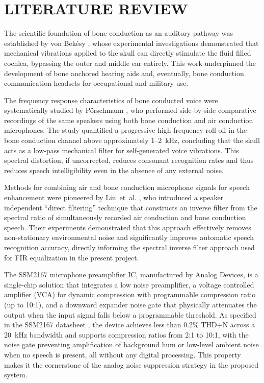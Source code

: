 \chapter{LITERATURE REVIEW}
The scientific foundation of bone conduction as an auditory pathway was established by von Bek\'{e}sy \cite{bekesy1960}, whose experimental investigations demonstrated that mechanical vibrations applied to the skull can directly stimulate the fluid filled cochlea, bypassing the outer and middle ear entirely. This work underpinned the development of bone anchored hearing aids and, eventually, bone conduction communication headsets for occupational and military use.

The frequency response characteristics of bone conducted voice were systematically studied by P\"{o}rschmann \cite{porschmann2000}, who performed side-by-side comparative recordings of the same speakers using both bone conduction and air conduction microphones. The study quantified a progressive high-frequency roll-off in the bone conduction channel above approximately 1--2~kHz, concluding that the skull acts as a low-pass mechanical filter for self-generated voice vibrations. This spectral distortion, if uncorrected, reduces consonant recognition rates and thus reduces speech intelligibility even in the absence of any external noise.

Methods for combining air and bone conduction microphone signals for speech enhancement were pioneered by Liu~et~al. \cite{liu2004}, who introduced a speaker independent ``direct filtering'' technique that constructs an inverse filter from the spectral ratio of simultaneously recorded air conduction and bone conduction speech. Their experiments demonstrated that this approach effectively removes non-stationary environmental noise and significantly improves automatic speech recognition accuracy, directly informing the spectral inverse filter approach used for FIR equalization in the present project.

The SSM2167 microphone preamplifier IC, manufactured by Analog Devices, is a single-chip solution that integrates a low noise preamplifier, a voltage controlled amplifier (VCA) for dynamic compression with programmable compression ratio (up to 10:1), and a downward expander noise gate that physically attenuates the output when the input signal falls below a programmable threshold. As specified in the SSM2167 datasheet \cite{ssm2167}, the device achieves less than 0.2\% THD+N across a 20~kHz bandwidth and supports compression ratios from 2:1 to 10:1, with the noise gate preventing amplification of background hum or low-level ambient noise when no speech is present, all without any digital processing. This property makes it the cornerstone of the analog noise suppression strategy in the proposed system.

